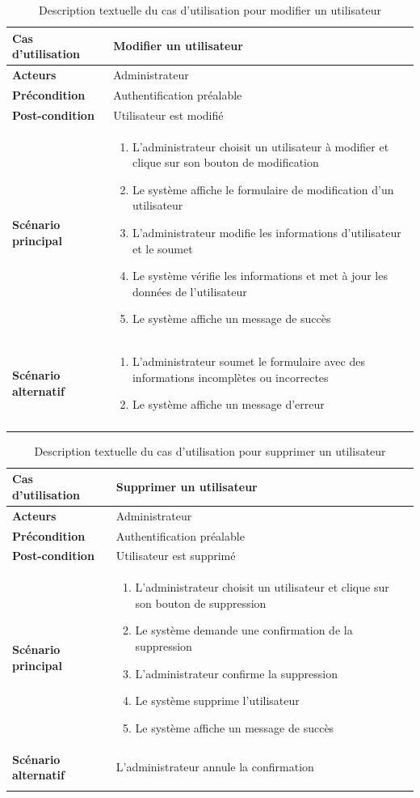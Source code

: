 \begin{longtable}{|>{\bfseries}p{4cm}|p{10cm}|}
\hline
Cas d'utilisation & Modifier un utilisateur \\
\hline
Acteurs & Administrateur \\
\hline
Précondition & Authentification préalable \\
\hline
Post-condition & Utilisateur est modifié \\
\hline
Scénario principal & 
\begin{enumerate}
  \item L'administrateur choisit un utilisateur à modifier et clique sur son bouton de modification
  \item Le système affiche le formulaire de modification d'un utilisateur
  \item L'administrateur modifie les informations d'utilisateur et le soumet
  \item Le système vérifie les informations et met à jour les données de l'utilisateur
  \item Le système affiche un message de succès
\end{enumerate} \\
\hline
Scénario alternatif & 
\begin{enumerate}
  \item L'administrateur soumet le formulaire avec des informations incomplètes ou incorrectes
  \item Le système affiche un message d'erreur
\end{enumerate} \\
\hline
\caption{Description textuelle du cas d'utilisation pour modifier un utilisateur}
\end{longtable}

\begin{longtable}{|>{\bfseries}p{4cm}|p{10cm}|}
\hline
Cas d'utilisation & Supprimer un utilisateur \\
\hline
Acteurs & Administrateur \\
\hline
Précondition & Authentification préalable \\
\hline
Post-condition & Utilisateur est supprimé \\
\hline
Scénario principal & 
\begin{enumerate}
  \item L'administrateur choisit un utilisateur et clique sur son bouton de suppression
  \item Le système demande une confirmation de la suppression
  \item L'administrateur confirme la suppression
  \item Le système supprime l'utilisateur
  \item Le système affiche un message de succès
\end{enumerate} \\
\hline
Scénario alternatif & L'administrateur annule la confirmation \\
\hline
\caption{Description textuelle du cas d'utilisation pour supprimer un utilisateur}
\end{longtable}

